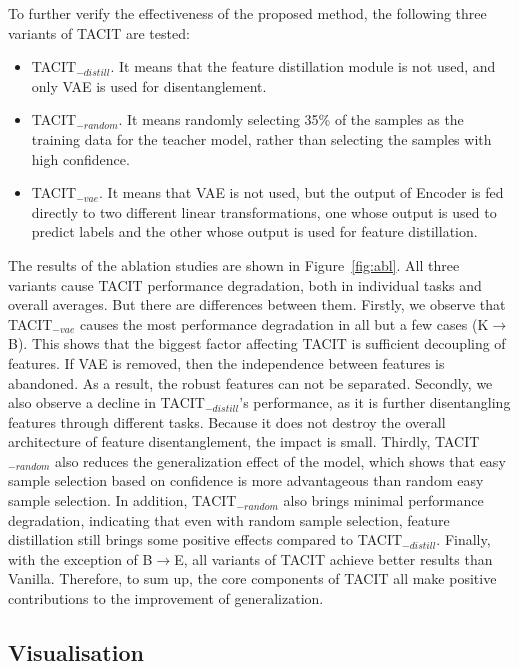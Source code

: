 \documentclass[letterpaper]{article} %
\begin{document}
To further verify the effectiveness of the proposed method, the following three variants of TACIT are tested:
\begin{itemize}
	\item TACIT$_{-distill}$. It means that the feature distillation module is not used, and only VAE is used for disentanglement.
	\item TACIT$_{-random}$. It means randomly selecting 35\% of the samples as the training data for the teacher model, rather than selecting the samples with high confidence.
	\item TACIT$_{-vae}$. It means that VAE is not used, but the output of Encoder is fed directly to two different linear transformations, one whose output is used to predict labels and the other whose output is used for feature distillation.
\end{itemize}
The results of the ablation studies are shown in Figure~\ref{fig:abl}. All three variants cause TACIT performance degradation, both in individual tasks and overall averages. But there are differences between them. Firstly, we observe that TACIT$_{-vae}$ causes the most performance degradation in all but a few cases (K$\to$B). This shows that the biggest factor affecting TACIT is sufficient decoupling of features. If VAE is removed, then the independence between features is abandoned. As a result, the robust features can not be separated. Secondly, we also observe a decline in TACIT$_{-distill}$'s performance, as it is further disentangling features through different tasks. Because it does not destroy the overall architecture of feature disentanglement, the impact is small. Thirdly, TACIT$_{-random}$ also reduces the generalization effect of the model, which shows that easy sample selection based on confidence is more advantageous than random easy sample selection. In addition, TACIT$_{-random}$ also brings minimal performance degradation, indicating that even with random sample selection, feature distillation still brings some positive effects compared to TACIT$_{-distill}$. Finally, with the exception of B$\to$E, all variants of TACIT achieve better results than Vanilla. Therefore, to sum up, the core components of TACIT all make positive contributions to the improvement of generalization.

\subsection{Visualisation}\label{sec:vis}
\end{document}
